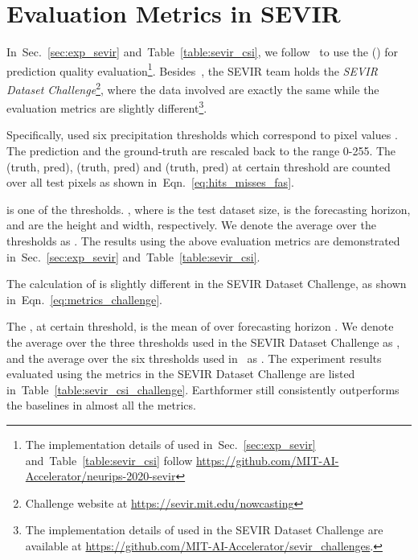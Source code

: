 \documentclass{article}
\newcommand{\tabref}[1]{Table~\ref{#1}}
\newcommand{\secref}[1]{Sec.~\ref{#1}}
\newcommand{\eqnref}[1]{Eqn.~\ref{#1}}
\begin{document}
\section{Evaluation Metrics in SEVIR}
In~\secref{sec:exp_sevir} and~\tabref{table:sevir_csi}, we follow~\cite{veillette2020sevir} to use the  () for prediction quality evaluation\footnote{The implementation details of  used in~\secref{sec:exp_sevir} and~\tabref{table:sevir_csi} follow \url{https://github.com/MIT-AI-Accelerator/neurips-2020-sevir}}.
Besides~\cite{veillette2020sevir}, the SEVIR team holds the \emph{SEVIR Dataset Challenge}\footnote{Challenge website at \url{https://sevir.mit.edu/nowcasting}}, where the data involved are exactly the same while the evaluation metrics are slightly different\footnote{The implementation details of  used in the SEVIR Dataset Challenge are available at \url{https://github.com/MIT-AI-Accelerator/sevir_challenges}.}.

Specifically, \cite{veillette2020sevir} used six precipitation thresholds which correspond to pixel values . 
The prediction and the ground-truth are rescaled back to the range 0-255.
The  (truth, pred),  (truth, pred) and  (truth, pred) at certain threshold  are counted over all test pixels as shown in~\eqnref{eq:hits_misses_fas}.



 is one of the thresholds. 
, where  is the test dataset size,  is the forecasting horizon,  and  are the height and width, respectively.
We denote the average  over the thresholds  as .
The results using the above evaluation metrics are demonstrated in~\secref{sec:exp_sevir} and~\tabref{table:sevir_csi}.

The calculation of  is slightly different in the SEVIR Dataset Challenge, as shown in~\eqnref{eq:metrics_challenge}.



The , at certain threshold, is the mean of  over forecasting horizon .
We denote the average  over the three thresholds  used in the SEVIR Dataset Challenge as , and the average  over the six thresholds  used in~\cite{veillette2020sevir} as .
The experiment results evaluated using the metrics in the SEVIR Dataset Challenge are listed in~\tabref{table:sevir_csi_challenge}.
Earthformer still consistently outperforms the baselines in almost all the metrics.
\end{document}
